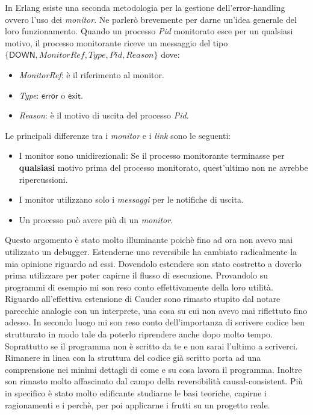 \documentclass[Tesi.tex]{subfiles}
\begin{document}
In Erlang esiste una seconda metodologia per la gestione dell'error-handling ovvero l'uso dei \textit{monitor}. Ne parlerò brevemente per darne un'idea generale del loro funzionamento.
Quando un processo \textit{Pid} monitorato esce per un qualsiasi motivo, il processo monitorante riceve un messaggio del tipo $\displaystyle\{\mathsf{DOWN},MonitorRef,Type,Pid,Reason\}$ dove:
	\begin{itemize}
		\item \textit{MonitorRef}: è il riferimento al monitor.
		\item \textit{Type}: $\mathsf{error}$ o $\mathsf{exit}$.
		\item \textit{Reason}: è il motivo di uscita del processo \textit{Pid}.
	\end{itemize}
Le principali differenze tra i \textit{monitor} e i \textit{link} sono le seguenti:
	\begin{itemize}
		\item I monitor sono unidirezionali: Se il processo monitorante terminasse per \textbf{qualsiasi} motivo prima del processo monitorato, quest'ultimo non ne avrebbe ripercussioni.
		\item I monitor utilizzano solo i \textit{messaggi} per le notifiche di uscita.
		\item Un processo può avere più di un \textit{monitor}.
	\end{itemize}
Questo argomento è stato molto illuminante poichè fino ad ora non avevo mai utilizzato un debugger.
Estenderne uno reversibile ha cambiato radicalmente la mia opinione riguardo ad essi. Dovendolo estendere son stato costretto a doverlo prima utilizzare per poter capirne il flusso di esecuzione. Provandolo su programmi di esempio mi son reso conto effettivamente della loro utilità. Riguardo all'effettiva estensione di Cauder sono rimasto stupito dal notare parecchie analogie con un interprete, una cosa su cui non avevo mai riflettuto fino adesso. In secondo luogo mi son reso conto dell'importanza di scrivere codice ben strutturato in modo tale da poterlo riprendere anche dopo molto tempo. Soprattutto se il programma non è scritto da te e non sarai l'ultimo a scriverci.
Rimanere in linea con la struttura del codice già scritto porta ad una comprensione nei minimi dettagli di come e su cosa lavora il programma.
Inoltre son rimasto molto affascinato dal campo della reversibilità causal-consistent.
Più in specifico è stato molto edificante studiarne le basi teoriche, capirne i ragionamenti e i perchè, per poi applicarne i frutti su un progetto reale. 
\end{document}
